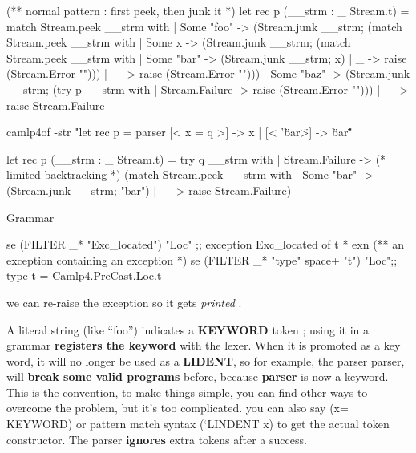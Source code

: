 \begin{enumerate}[(a)]
\begin{enumerate}[(a)]
\begin{bluecode}
(** normal pattern : first peek, then junk it *)
let rec p (__strm : _ Stream.t) =
  match Stream.peek __strm with
  | Some "foo" ->
      (Stream.junk __strm;
       (match Stream.peek __strm with
        | Some x ->
            (Stream.junk __strm;
             (match Stream.peek __strm with
              | Some "bar" -> (Stream.junk __strm; x)
              | _ -> raise (Stream.Error "")))
        | _ -> raise (Stream.Error "")))
  | Some "baz" ->
      (Stream.junk __strm;
       (try p __strm with | Stream.Failure -> raise (Stream.Error "")))
  | _ -> raise Stream.Failure
\end{bluecode}

\begin{redcode}
camlp4of -str "let rec p = parser [< x = q >] -> x | [< '\"bar\">] -> \"bar\""
\end{redcode}

\begin{bluecode}
let rec p (__strm : _ Stream.t) =
  try q __strm
  with
  | Stream.Failure -> (* limited backtracking *)
      (match Stream.peek __strm with
       | Some "bar" -> (Stream.junk __strm; "bar")
       | _ -> raise Stream.Failure)
       
\end{bluecode}


Grammar


\begin{bluecode}
se (FILTER _* "Exc_located") "Loc" ;;
exception Exc_located of t * exn 
(** an exception containing an exception *)
se (FILTER _* "type" space+ "t") "Loc";; 
type t = Camlp4.PreCast.Loc.t
\end{bluecode}

we can re-raise the exception so it gets \textit{printed} .

A literal string (like ``foo'') indicates a \textbf{KEYWORD} token ;
using it in a grammar \textbf{registers the keyword} with the lexer. When
it is promoted as a key word, it will no longer be used as a \textbf{
  LIDENT}, so for example, the parser parser, will \textbf{break some valid
programs} before, because \textbf{parser} is now a keyword. This is the
convention, to make things simple, you can find other ways to overcome
the problem, but it's too complicated. you can also say (x= KEYWORD)
or pattern match syntax (`LINDENT x) to get the actual token
constructor. The parser \textbf{ignores} extra tokens after a success.


\end{enumerate}
\end{enumerate}
